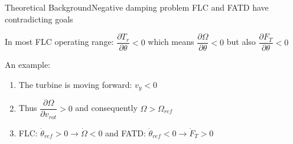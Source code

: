 
\begin{frame}{Theoretical Background}{Negative damping problem}
	FLC and FATD have contradicting goals
	
	\smallskip
	In most FLC operating range: $ \dfrac{\partial T_r}{\partial \theta} < 0 $ which means $ \dfrac{\partial \Omega}{\partial \theta} < 0 $ but also $ \dfrac{\partial F_T}{\partial \theta} < 0 $ 

	\smallskip
	An example:
	\begin{enumerate}
		\item The turbine is moving forward: $ v_y < 0 $
		\item Thus $ \dfrac{\partial \Omega}{\partial v_{rot}} > 0 $ and consequently $ \Omega > \Omega_{ref} $
		\item FLC: $ \dot \theta_{ref} > 0 \rightarrow \dot \Omega < 0 $ and FATD: $ \dot \theta_{ref} < 0 \rightarrow \dot F_T > 0 $
	\end{enumerate}

\end{frame}


%
